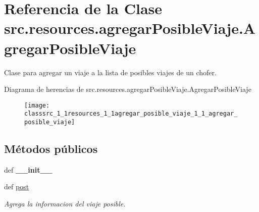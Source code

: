 \hypertarget{classsrc_1_1resources_1_1agregar_posible_viaje_1_1_agregar_posible_viaje}{\section{Referencia de la Clase src.\-resources.\-agregar\-Posible\-Viaje.\-Agregar\-Posible\-Viaje}
\label{classsrc_1_1resources_1_1agregar_posible_viaje_1_1_agregar_posible_viaje}
}


Clase para agregar un viaje a la lista de posibles viajes de un chofer.  


Diagrama de herencias de src.\-resources.\-agregar\-Posible\-Viaje.\-Agregar\-Posible\-Viaje\begin{figure}[H]
\begin{center}
\leavevmode
\texttt{[image: classsrc\_1\_1resources\_1\_1agregar\_posible\_viaje\_1\_1\_agregar\_posible\_viaje]}
\end{center}
\end{figure}
\subsection*{Métodos públicos}
\begin{DoxyCompactItemize}
\item 
\hypertarget{classsrc_1_1resources_1_1agregar_posible_viaje_1_1_agregar_posible_viaje_a0eb8e6dc028544d8ab763ad50e18b734}{def {\bfseries \-\_\-\-\_\-init\-\_\-\-\_\-}}\label{classsrc_1_1resources_1_1agregar_posible_viaje_1_1_agregar_posible_viaje_a0eb8e6dc028544d8ab763ad50e18b734}

\item 
def \hyperlink{classsrc_1_1resources_1_1agregar_posible_viaje_1_1_agregar_posible_viaje_a6842769a8d9d3ba65137ea0b9bd0d21c}{post}
\begin{DoxyCompactList}\small\item\em Agrega la informacion del viaje posible. \end{DoxyCompactList}\end{DoxyCompactItemize}
